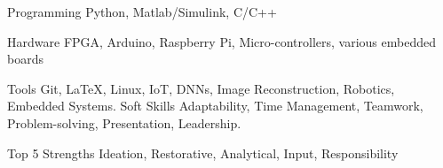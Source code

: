

\begin{cvskills}

  \cvskill
    {Programming} %
    {Python, Matlab/Simulink, C/C++} %

  \cvskill
    {Hardware} %
    {FPGA, Arduino, Raspberry Pi, Micro-controllers, various embedded boards} %

  \cvskill
    {Tools} %
    {Git, \LaTeX, Linux, IoT, DNNs, Image Reconstruction, Robotics, Embedded Systems.} %
  \cvskill
    {Soft Skills} %
    {Adaptability, Time Management, Teamwork, Problem-solving,  Presentation, Leadership.} %

  \cvskill
    {Top 5 Strengths} %
    {Ideation, Restorative,	Analytical,	Input, Responsibility} %

\end{cvskills}
